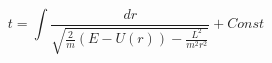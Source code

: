 \documentclass[12pt,a4paper]{book}
\begin{document}
$$t=\int\frac{dr}{\sqrt{\frac2m\left(E-U(r)\right)-\frac{L^2}{m^2r^2}}} + Const$$
\end{document}
